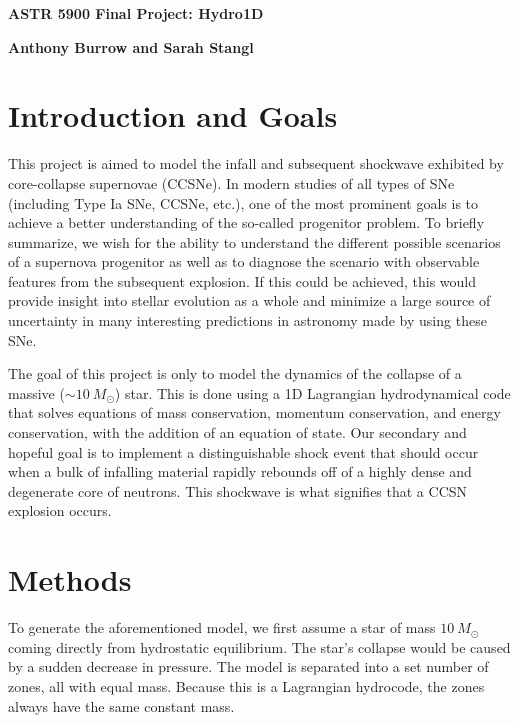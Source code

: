 \documentclass[12pt]{article}
\begin{document}
\begin{center}\begin{LARGE}
\textbf{ASTR 5900 Final Project: Hydro1D}
\end{LARGE}\end{center}

\begin{center}
\textbf{Anthony Burrow and Sarah Stangl}
\end{center}

\section{Introduction and Goals}

This project is aimed to model the infall and subsequent shockwave exhibited by
core-collapse supernovae (CCSNe). In modern studies of all types of SNe
(including Type Ia SNe, CCSNe, etc.), one of the most prominent goals is to achieve a better understanding of the so-called progenitor problem. To
briefly summarize, we wish for the ability to understand the different possible
scenarios of a supernova progenitor as well as to diagnose the scenario with
observable features from the subsequent explosion. If this could be achieved,
this would provide insight into stellar evolution as a whole and minimize a
large source of uncertainty in many interesting predictions in astronomy made
by using these SNe.

The goal of this project is only to model the dynamics of the collapse of a
massive ($\sim10\ M_\odot$) star. This is done using a 1D Lagrangian
hydrodynamical code that solves equations of mass conservation, momentum
conservation, and energy conservation, with the addition of an equation of
state. Our secondary and hopeful goal is to implement a distinguishable shock event
that should occur when a bulk of infalling material rapidly rebounds off of a
highly dense and degenerate core of neutrons. This shockwave is what signifies that a CCSN explosion occurs.

\section{Methods}

To generate the aforementioned model, we first assume a star of mass
$10\ M_\odot$ coming directly from hydrostatic equilibrium. The star's collapse
would be caused by a sudden decrease in pressure. The model is separated into a
set number of zones, all with equal mass. Because this is a Lagrangian
hydrocode, the zones always have the same constant mass.
\end{document}
